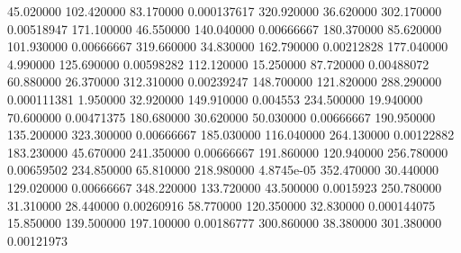 45.020000	102.420000	83.170000	0.000137617
320.920000	36.620000	302.170000	0.00518947
171.100000	46.550000	140.040000	0.00666667
180.370000	85.620000	101.930000	0.00666667
319.660000	34.830000	162.790000	0.00212828
177.040000	4.990000	125.690000	0.00598282
112.120000	15.250000	87.720000	0.00488072
60.880000	26.370000	312.310000	0.00239247
148.700000	121.820000	288.290000	0.000111381
1.950000	32.920000	149.910000	0.004553
234.500000	19.940000	70.600000	0.00471375
180.680000	30.620000	50.030000	0.00666667
190.950000	135.200000	323.300000	0.00666667
185.030000	116.040000	264.130000	0.00122882
183.230000	45.670000	241.350000	0.00666667
191.860000	120.940000	256.780000	0.00659502
234.850000	65.810000	218.980000	4.8745e-05
352.470000	30.440000	129.020000	0.00666667
348.220000	133.720000	43.500000	0.0015923
250.780000	31.310000	28.440000	0.00260916
58.770000	120.350000	32.830000	0.000144075
15.850000	139.500000	197.100000	0.00186777
300.860000	38.380000	301.380000	0.00121973
